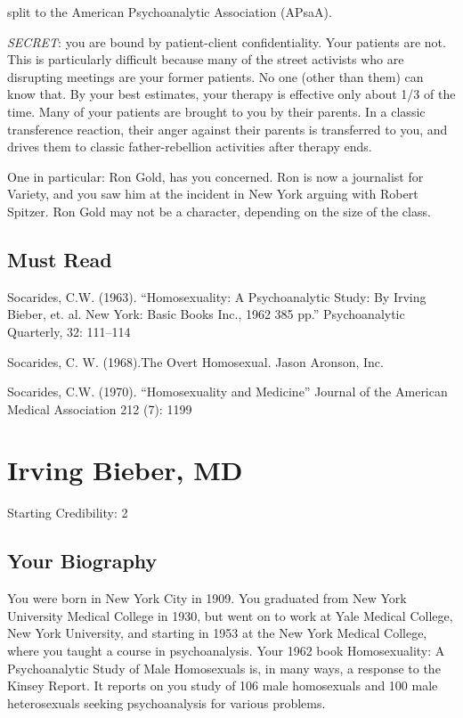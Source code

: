 \begin{refsection}
split to the American Psychoanalytic Association (APsaA).

\emph{SECRET}: you are bound by patient-client confidentiality. Your patients are not. This is particularly difficult because many of the street activists who are disrupting meetings are your former patients. No one (other than them) can know that. By your best estimates, your therapy is effective only about 1\slash 3 of the time. Many of your patients are brought to you by their parents. In a classic transference reaction, their anger against their parents is transferred to you, and drives them to classic father-rebellion activities after therapy ends. 

One in particular: Ron Gold, has you concerned. Ron is now a journalist for Variety, and you saw him at the incident in New York arguing with Robert Spitzer. Ron Gold may not be a character, depending on the size of the class.

\section{Must Read}
\label{mustread}

Socarides, C.W. (1963). “Homosexuality: A Psychoanalytic Study: By Irving Bieber, et. al. New York: Basic Books Inc., 1962 385 pp.” Psychoanalytic Quarterly, 32: 111--114

Socarides, C. W. (1968).The Overt Homosexual. Jason Aronson, Inc.

Socarides, C.W. (1970). “Homosexuality and Medicine” Journal of the American Medical Association 212 (7): 1199

\chapter{Irving Bieber, MD}
\label{irvingbiebermd}

Starting Credibility: 2

\section{Your Biography}
\label{yourbiography}

You were born in New York City in 1909. You graduated from New York University Medical College in 1930, but went on to work at Yale Medical College, New York University, and starting in 1953 at the New York Medical College, where you taught a course in psychoanalysis. Your 1962 book Homosexuality: A Psychoanalytic Study of Male Homosexuals is, in many ways, a response to the Kinsey Report. It reports on you study of 106 male homosexuals and 100 male heterosexuals seeking psychoanalysis for various problems.


\end{refsection}
